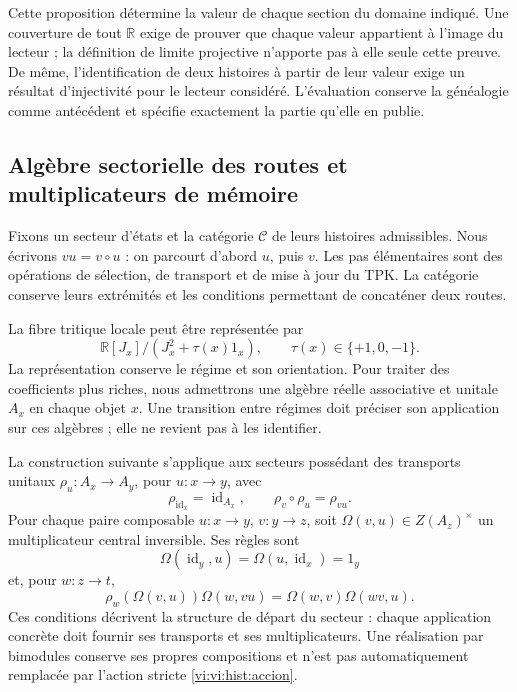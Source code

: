 Cette proposition détermine la valeur de chaque section du domaine indiqué.
Une couverture de tout \(\mathbb R\) exige de prouver que chaque valeur
appartient à l'image du lecteur ; la définition de limite projective
n'apporte pas à elle seule cette preuve. De même, l'identification de deux
histoires à partir de leur valeur exige un résultat d'injectivité
pour le lecteur considéré. L'évaluation conserve la généalogie comme
antécédent et spécifie exactement la partie qu'elle en publie.

\subsection{Algèbre sectorielle des routes et multiplicateurs de mémoire}
\label{vi:vi:hist:algebra}

Fixons un secteur d’états et la catégorie \(\mathcal C\) de leurs
histoires admissibles. Nous écrivons \(vu=v\circ u\) : on parcourt d’abord
\(u\), puis \(v\). Les pas élémentaires sont des opérations de
sélection, de transport et de mise à jour du TPK. La catégorie conserve
leurs extrémités et les conditions permettant de concaténer deux routes.

La fibre tritique locale peut être représentée par
\[
 \mathbb R[J_x]/(J_x^2+\tau(x)1_x),
 \qquad \tau(x)\in\{+1,0,-1\}.
\]
La représentation conserve le régime et son orientation. Pour traiter
des coefficients plus riches, nous admettrons une algèbre réelle associative et
unitale \(A_x\) en chaque objet \(x\). Une transition entre régimes
doit préciser son application sur ces algèbres ; elle ne revient pas à les identifier.

La construction suivante s’applique aux secteurs possédant des transports
unitaux \(\rho_u:A_x\to A_y\), pour \(u:x\to y\), avec
\begin{equation}
 \rho_{\operatorname{id}_x}=\operatorname{id}_{A_x},\qquad
 \rho_v\circ\rho_u=\rho_{vu}.
 \label{vi:vi:hist:accion}
\end{equation}
Pour chaque paire composable \(u:x\to y\), \(v:y\to z\), soit
\(\Omega(v,u)\in Z(A_z)^\times\) un multiplicateur central inversible.
Ses règles sont
\begin{equation}
 \Omega(\operatorname{id}_y,u)
 =\Omega(u,\operatorname{id}_x)=1_y
 \label{vi:vi:hist:normalizacion}
\end{equation}
et, pour \(w:z\to t\),
\begin{equation}
 \rho_w\!\left(\Omega(v,u)\right)\Omega(w,vu)
 =\Omega(w,v)\Omega(wv,u).
 \label{vi:vi:hist:cociclo}
\end{equation}
Ces conditions décrivent la structure de départ du secteur : chaque
application concrète doit fournir ses transports et ses multiplicateurs.
Une réalisation par bimodules conserve ses propres compositions et
n’est pas automatiquement remplacée par l’action stricte
\eqref{vi:vi:hist:accion}.

